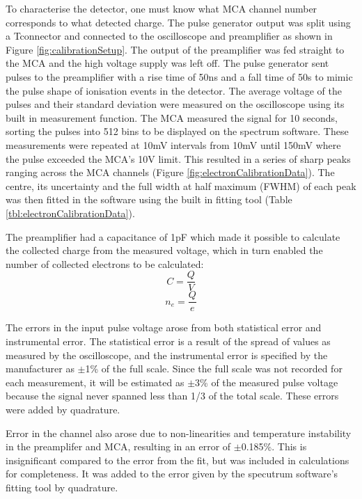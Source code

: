 To characterise the detector, one must know what MCA channel number corresponds to what detected charge. The pulse generator output was split using a \textquotesingle T\textquotesingle \space connector and connected to the oscilloscope and preamplifier as shown in Figure \ref{fig:calibrationSetup}. The output of the preamplifier was fed straight to the MCA and the high voltage supply was left off. The pulse generator sent pulses to the preamplifier with a rise time of 50ns and a fall time of 50\textmu s to mimic the pulse shape of ionisation events in the detector. The average voltage of the pulses and their standard deviation were measured on the oscilloscope using its built in measurement function. The MCA measured the signal for 10 seconds, sorting the pulses into 512 bins to be displayed on the spectrum software. These measurements were repeated at 10mV intervals from 10mV until 150mV where the pulse exceeded the MCA's 10V limit. This resulted in a series of sharp peaks ranging across the MCA channels (Figure \ref{fig:electronCalibrationData}). The centre, its uncertainty and the full width at half maximum (FWHM) of each peak was then fitted in the software using the built in fitting tool (Table \ref{tbl:electronCalibrationData}).

The preamplifier had a capacitance of 1pF which made it possible to calculate the collected charge from the measured voltage, which in turn enabled the number of collected electrons to be calculated:
\begin{equation}
    C = \frac{Q}{V}
    \label{eqn:C=Q/V}
\end{equation}
\begin{equation}
    n_e = \frac{Q}{e}
    \label{eqn:n_e}
\end{equation}

The errors in the input pulse voltage arose from both statistical error and instrumental error. The statistical error is a result of the spread of values as measured by the oscilloscope, and the instrumental error is specified by the manufacturer as $\pm$1\% of the full scale. Since the full scale was not recorded for each measurement, it will be estimated as $\pm$3\% of the measured pulse voltage because the signal never spanned less than 1/3 of the total scale. These errors were added by quadrature.

Error in the channel also arose due to non-linearities and temperature instability in the preamplifer and MCA, resulting in an error of $\pm$0.185\%. This is insignificant compared to the error from the fit, but was included in calculations for completeness. It was added to the error given by the specutrum software's fitting tool by quadrature.

